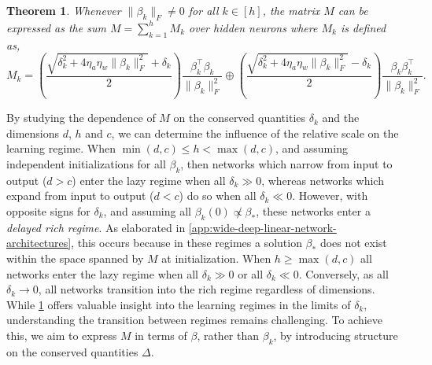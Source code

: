 \documentclass{article}
\theoremstyle{plain}
\newtheorem{theorem}{Theorem}[section]
\theoremstyle{definition}
\theoremstyle{remark}
\begin{document}
\begin{theorem}
    \label{thrm:vec_beta}
    Whenever $\|\beta_k\|_F \neq 0$ for all $k \in [h]$, the matrix $M$ can be expressed as the sum $M = \sum_{k = 1}^h M_k$ over hidden neurons where $M_k$ is defined as,
    \begin{equation}
    \label{eq:Mi}
        M_k = \left(\frac{\sqrt{\delta_k^2 + 4\eta_a\eta_w\|\beta_k\|_F^2} + \delta_k}{2}\right)\frac{\beta_k^\intercal\beta_k}{\|\beta_k\|_F^2} \oplus \left(\frac{\sqrt{\delta_k^2 + 4\eta_a\eta_w\|\beta_k\|_F^2} - \delta_k}{2}\right)\frac{\beta_k\beta_k^\intercal}{\|\beta_k\|_F^2}.
    \end{equation}
\end{theorem}





By studying the dependence of $M$ on the conserved quantities $\delta_k$ and the dimensions $d$, $h$ and $c$, we can determine the influence of the relative scale on the learning regime.
%
When $\min (d,c) \le h < \max (d,c)$, and assuming independent initializations for all $\beta_k$, then networks which narrow from input to output ($d > c$) enter the lazy regime when all \(\delta_k \gg 0\), whereas networks which expand from input to output ($d < c$) do so when all \(\delta_k \ll 0\).
%
However, with opposite signs for $\delta_k$, and assuming all $\beta_k(0) \not\propto \beta_*$, these networks enter a \emph{delayed rich regime}.
%
As elaborated in \cref{app:wide-deep-linear-network-architectures},  this occurs because in these regimes a solution \(\beta_{*}\) does not exist within the space spanned by \(M\) at initialization.
%
When $h \ge \max (d,c)$ all networks enter the lazy regime when all $\delta_k \gg 0$ or all  $\delta_k \ll 0$.
%
Conversely, as all $\delta_k \to 0$, all networks  transition into the rich regime regardless of dimensions.
%
While \cref{thrm:vec_beta} offers valuable insight into the learning regimes in the limits of $\delta_k$, understanding the transition between regimes remains challenging. 
%
To achieve this, we aim to express $M$ in terms of $\beta$, rather than $\beta_k$, by introducing structure on the conserved quantities $\Delta$.
\end{document}
